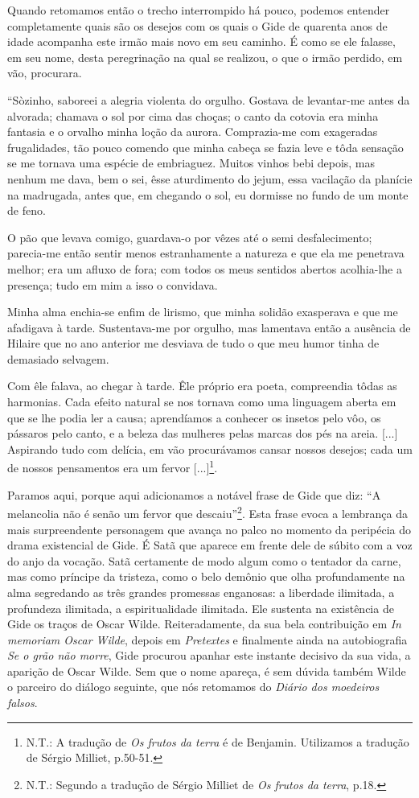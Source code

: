Quando retomamos então o trecho interrompido há pouco, podemos entender
completamente quais são os desejos com os quais o Gide de quarenta anos
de idade acompanha este irmão mais novo em seu caminho. É como se ele
falasse, em seu nome, desta peregrinação na qual se realizou, o que o
irmão perdido, em vão, procurara.

``Sòzinho, saboreei a alegria violenta do orgulho. Gostava de
levantar-me antes da alvorada; chamava o sol por cima das choças; o
canto da cotovia era minha fantasia e o orvalho minha loção da aurora.
Comprazia-me com exageradas frugalidades, tão pouco comendo que minha
cabeça se fazia leve e tôda sensação se me tornava uma espécie de
embriaguez. Muitos vinhos bebi depois, mas nenhum me dava, bem o sei,
êsse aturdimento do jejum, essa vacilação da planície na madrugada,
antes que, em chegando o sol, eu dormisse no fundo de um monte de feno.

O pão que levava comigo, guardava-o por vêzes até o semi desfalecimento;
parecia-me então sentir menos estranhamente a natureza e que ela me
penetrava melhor; era um afluxo de fora; com todos os meus sentidos
abertos acolhia-lhe a presença; tudo em mim a isso o convidava.

Minha alma enchia-se enfim de lirismo, que minha solidão exasperava e
que me afadigava à tarde. Sustentava-me por orgulho, mas lamentava então
a ausência de Hilaire que no ano anterior me desviava de tudo o que meu
humor tinha de demasiado selvagem.

Com êle falava, ao chegar à tarde. Êle próprio era poeta, compreendia
tôdas as harmonias. Cada efeito natural se nos tornava como uma
linguagem aberta em que se lhe podia ler a causa; aprendíamos a conhecer
os insetos pelo vôo, os pássaros pelo canto, e a beleza das mulheres
pelas marcas dos pés na areia. {[}...{]} Aspirando tudo com delícia, em
vão procurávamos cansar nossos desejos; cada um de nossos pensamentos
era um fervor {[}...{]}\footnote{N.T.: A tradução de \emph{Os frutos da
  terra} é de Benjamin. Utilizamos a tradução de Sérgio Milliet,
  p.50-51.}.

Paramos aqui, porque aqui adicionamos a notável frase de Gide que diz:
``A melancolia não é senão um fervor que descaiu''\footnote{N.T.:
  Segundo a tradução de Sérgio Milliet de \emph{Os frutos da terra},
  p.18.}. Esta frase evoca a lembrança da mais surpreendente personagem
que avança no palco no momento da peripécia do drama existencial de
Gide. É Satã que aparece em frente dele de súbito com a voz do anjo da
vocação. Satã certamente de modo algum como o tentador da carne, mas
como príncipe da tristeza, como o belo demônio que olha profundamente na
alma segredando as três grandes promessas enganosas: a liberdade
ilimitada, a profundeza ilimitada, a espiritualidade ilimitada. Ele
sustenta na existência de Gide os traços de Oscar Wilde. Reiteradamente,
da sua bela contribuição em \emph{In memoriam Oscar Wilde}, depois em
\emph{Pretextes} e finalmente ainda na autobiografia \emph{Se o grão não
morre}, Gide procurou apanhar este instante decisivo da sua vida, a
aparição de Oscar Wilde. Sem que o nome apareça, é sem dúvida também
Wilde o parceiro do diálogo seguinte, que nós retomamos do \emph{Diário
dos moedeiros falsos}.

